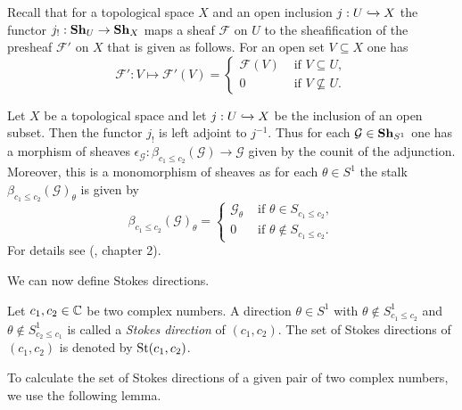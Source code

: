 Recall that for a topological space $X$ and an open inclusion $j:U \xhookrightarrow{} X$ the functor $j_!: \mathbf{Sh}_{U} \to \mathbf{Sh}_X$ maps a sheaf $\mathcal{F}$ on $U$ to the sheafification of the presheaf $\mathcal{F}'$ on $X$ that is given as follows. For an open set $V \subseteq X$ one has
\[
 \mathcal{F}': V \mapsto \mathcal{F}'(V) = \begin{cases}
    \mathcal{F}(V) & \text{ if } V \subseteq U, \\
    0 &\text{ if } V \not\subseteq U.
\end{cases}
\]

\begin{rem}
    Let $X$ be a topological space and let $j:U \xhookrightarrow{} X$ be the inclusion of an open subset. Then the functor $j_!$ is left adjoint to $j^{-1}$.
    Thus for each $\mathcal{G} \in \mathbf{Sh}_{S^1}$ one has a morphism of sheaves $\epsilon_{\mathcal{G}}:\beta_{c_1 \leq c_2}(\mathcal{G}) \to \mathcal{G}$ given by the counit of the adjunction. Moreover, this is a monomorphism of sheaves as for each $\theta \in S^1$ the stalk $\beta_{c_1 \leq c_2}(\mathcal{G})_\theta$ is given by
    \[
        \beta_{c_1 \leq c_2}(\mathcal{G})_\theta = \begin{cases}
            \mathcal{G}_\theta &\text{ if } \theta \in S_{c_1 \leq c_2}, \\
            0 &\text{ if } \theta \not\in S_{c_1 \leq c_2}.
        \end{cases}
    \]
    For details see (\cite{Hart}, chapter 2).
\end{rem}

We can now define Stokes directions.

\begin{defi}
   Let $c_1,c_2 \in \mathbb{C}$ be two complex numbers. A direction $\theta \in S^1$ with $\theta \not\in S_{c_1 \leq c_2}^1$ and $\theta \not\in S_{c_2 \leq c_1}^1$ is called a \emph{Stokes direction} of $(c_1, c_2)$. The set of Stokes directions of $(c_1,c_2)$ is denoted by $\operatorname{St}(c_1,c_2)$.
\end{defi}

To calculate the set of Stokes directions of a given pair of two complex numbers, we use the following lemma.

